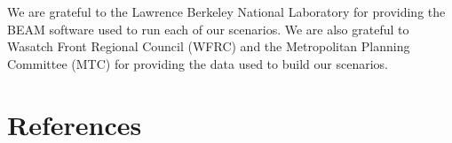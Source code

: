 \documentclass[]{elsarticle} %
\begin{document}
We are grateful to the Lawrence Berkeley National Laboratory for providing the BEAM software used to run each of our scenarios. We are also grateful to Wasatch Front Regional Council (WFRC) and the Metropolitan Planning Committee (MTC) for providing the data used to build our scenarios.

\hypertarget{references}{%
\section{References}\label{references}}


\end{document}
